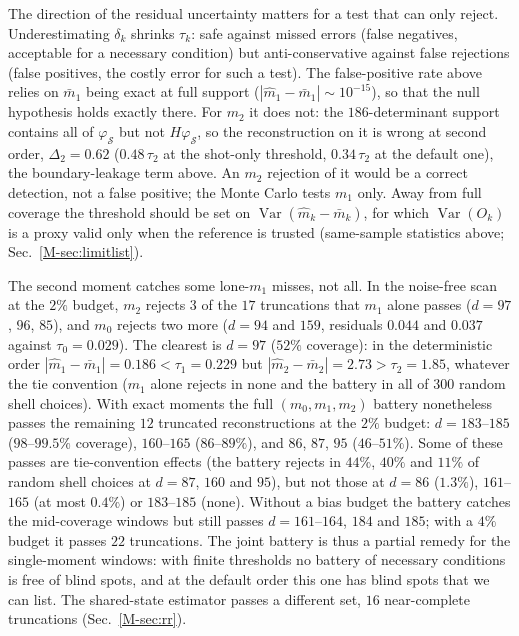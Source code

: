 \documentclass[aps,prb,onecolumn,superscriptaddress,longbibliography,floatfix]{revtex4-2}
\begin{document}
The direction of the residual uncertainty matters for a test that can only reject. Underestimating $\delta_k$ shrinks $\tau_k$: safe against missed errors (false negatives, acceptable for a necessary condition) but anti-conservative against false rejections (false positives, the costly error for such a test). The false-positive rate above relies on $\bar m_1$ being exact at full support ($|\widehat m_1-\bar m_1|\sim10^{-15}$), so that the null hypothesis holds exactly there. For $m_2$ it does not: the $186$-determinant support contains all of $\varphi_\mathcal{S}$ but not $H\varphi_\mathcal{S}$, so the reconstruction on it is wrong at second order, $\Delta_2=0.62$ ($0.48\,\tau_2$ at the shot-only threshold, $0.34\,\tau_2$ at the default one), the boundary-leakage term above. An $m_2$ rejection of it would be a correct detection, not a false positive; the Monte Carlo tests $m_1$ only. Away from full coverage the threshold should be set on $\operatorname{Var}(\widehat m_k-\bar m_k)$, for which $\operatorname{Var}(O_k)$ is a proxy valid only when the reference is trusted (same-sample statistics above; Sec.~\ref{M-sec:limitlist}).

The second moment catches some lone-$m_1$ misses, not all. In the noise-free scan at the $2\%$ budget, $m_2$ rejects $3$ of the $17$ truncations that $m_1$ alone passes ($d=97$, $96$, $85$), and $m_0$ rejects two more ($d=94$ and $159$, residuals $0.044$ and $0.037$ against $\tau_0=0.029$). The clearest is $d=97$ ($52\%$ coverage): in the deterministic order $|\widehat m_1-\bar m_1|=0.186<\tau_1=0.229$ but $|\widehat m_2-\bar m_2|=2.73>\tau_2=1.85$, whatever the tie convention ($m_1$ alone rejects in none and the battery in all of $300$ random shell choices). With exact moments the full $(m_0,m_1,m_2)$ battery nonetheless passes the remaining $12$ truncated reconstructions at the $2\%$ budget: $d=183$--$185$ ($98$--$99.5\%$ coverage), $160$--$165$ ($86$--$89\%$), and $86$, $87$, $95$ ($46$--$51\%$). Some of these passes are tie-convention effects (the battery rejects in $44\%$, $40\%$ and $11\%$ of random shell choices at $d=87$, $160$ and $95$), but not those at $d=86$ ($1.3\%$), $161$--$165$ (at most $0.4\%$) or $183$--$185$ (none). Without a bias budget the battery catches the mid-coverage windows but still passes $d=161$--$164$, $184$ and $185$; with a $4\%$ budget it passes $22$ truncations. The joint battery is thus a partial remedy for the single-moment windows: with finite thresholds no battery of necessary conditions is free of blind spots, and at the default order this one has blind spots that we can list. The shared-state estimator passes a different set, $16$ near-complete truncations (Sec.~\ref{M-sec:rr}).
\end{document}
